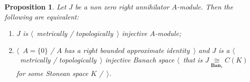 \documentclass[12pt]{article}
\newcommand{\isom}[1]{\mathop{\mathbin{\cong}}\limits_{#1}}
\newtheorem{proposition}[theorem]{Proposition}
\begin{document}
\begin{proposition}\label{MetTopInjOfAnnihModCharac} Let $J$ be a non zero right
    annihilator $A$-module. Then the following are equivalent:
    \begin{enumerate}[label = (\roman*)]
        \item $J$ is $\langle$~metrically / topologically~$\rangle$ injective
              $A$-module;

        \item $\langle$~$A=\{0\}$ / $A$ has a right bounded approximate
              identity~$\rangle$ and $J$ is a $\langle$~metrically /
              topologically~$\rangle$ injective Banach space $\langle$~that is
              $J\isom{\mathbf{Ban}_1}C(K)$ for some Stonean space $K$
              /~$\rangle$.
    \end{enumerate}
\end{proposition}
\end{document}
